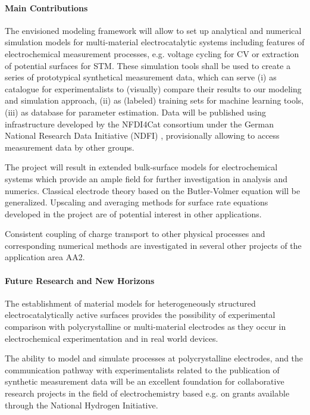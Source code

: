 \documentclass[a4paper,10pt]{article}
\begin{document}
\paragraph{Main Contributions}
The envisioned modeling framework will allow to set up analytical and numerical simulation models for multi-material electrocatalytic systems including  features of  electrochemical measurement processes, e.g. voltage cycling for CV or extraction of potential surfaces for STM.
These simulation tools shall be used to create a series of prototypical synthetical measurement data, which can serve (i) as catalogue for experimentalists to (visually) compare their results to our modeling and simulation approach, (ii) as (labeled)  training sets for machine learning tools,  (iii) as database for parameter estimation. Data will be published using infrastructure developed by the NFDI4Cat consortium under the German National Research Data Initiative (NDFI) \cite{NFDI4Cat}, provisionally allowing to access measurement data by other groups.

The project will result in extended bulk-surface models for electrochemical systems which provide an ample field for further investigation in analysis and numerics.
Classical electrode theory based on the Butler-Volmer equation will be generalized.  Upscaling and averaging methods for surface rate equations developed in the project are of potential interest in other applications.

Consistent coupling of charge transport to other physical processes and
corresponding numerical methods are investigated in several other projects of the application area AA2.

\paragraph{Future Research and New Horizons}
The establishment of material models for heterogeneously structured electrocatalytically active surfaces
provides the possibility of experimental comparison with polycrystalline or  multi-material electrodes
as they occur in electrochemical experimentation and in real world devices.

The ability to model and simulate processes at polycrystalline electrodes, and the communication pathway with experimentalists related to the publication of synthetic measurement data will be an excellent foundation
for collaborative research projects in the field of electrochemistry based e.g. on grants available through
the National Hydrogen Initiative.
\end{document}
